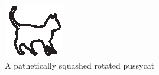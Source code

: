 \documentclass[twoside]{report}
\begin{document}
\begin{figure}
  \centerline{\includegraphics[width=.8\textheight,height=.4\textwidth]{cat}}
\caption{A pathetically squashed rotated pussycat}\label{rotfloat4}
\end{figure}
\end{document}
